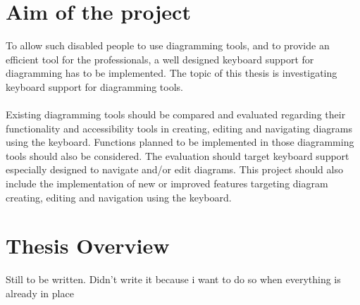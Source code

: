 \section{Aim of the project}
To allow such disabled people to use diagramming tools, and to provide an efficient tool for the professionals, a well designed keyboard support for diagramming has to be implemented.
The topic of this thesis is investigating keyboard support for diagramming tools.

\paragraph{}
Existing diagramming tools should be compared and evaluated regarding their functionality and accessibility tools in creating, editing and navigating diagrams using the keyboard. Functions planned to be implemented in those diagramming tools should also be considered. The evaluation should target keyboard support especially designed to navigate and/or edit diagrams.
This project should also include the implementation of new or improved features targeting diagram creating, editing and navigation using the keyboard.

\section{Thesis Overview}
Still to be written. Didn't write it because i want to do so when everything is already in place


